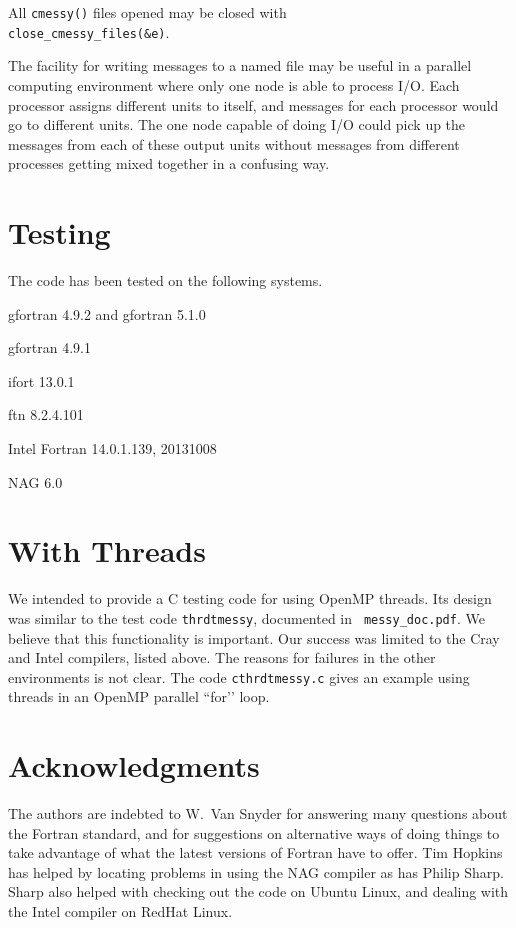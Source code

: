 \documentclass[12pt]{article}
\begin{document}
All {\tt cmessy()} files opened may be closed with\\

{\tt close\_cmessy\_files(\&e)}.

The facility for writing messages to a named file may be useful in a parallel
computing environment where only one node is able to process I/O.  Each
processor assigns different units to itself, and messages for each processor
would go to different units. The one node capable of doing I/O could pick up the
messages from each of these output units without messages from different
processes getting mixed together in a confusing way.


\section{Testing}
\label{sec:testing}


The code has been tested on the following systems.
\begin{description}\setlength{\itemsep}{-2pt}
\item[Gentoo Linux:] gfortran  4.9.2 and gfortran 5.1.0
\item[Ubuntu Linux:] gfortran 4.9.1
\item[Red Hat Enterprise Linux:] ifort 13.0.1
\item[Cray CCE:] ftn  8.2.4.101
\item[Windows 7:] Intel Fortran 14.0.1.139, 20131008
\item[Ubuntu Linux:] NAG 6.0
\end{description}
\section{With Threads}
We intended to provide a C testing code for using OpenMP threads.  Its design
was similar to the test code {\tt thrdtmessy}, documented in {\tt
  messy\_doc.pdf}.  We believe that this functionality is important. Our success
was limited to the Cray and Intel compilers, listed above.  The reasons for
failures in the other environments is not clear.   The code {\tt cthrdtmessy.c} gives
an example  using threads in an OpenMP parallel ``for\rq{}\rq{} loop. 

\section{Acknowledgments}
\label{sec:acknowledgments}

The authors are indebted to W.\ Van Snyder for answering many questions about
the Fortran standard, and for suggestions on alternative ways of doing things to
take advantage of what the latest versions of Fortran have to offer.  Tim
Hopkins has helped by locating problems in using the NAG compiler as has Philip Sharp.
Sharp also helped with
checking out the code on Ubuntu Linux, and dealing with the Intel compiler on
RedHat Linux.



\end{document}

